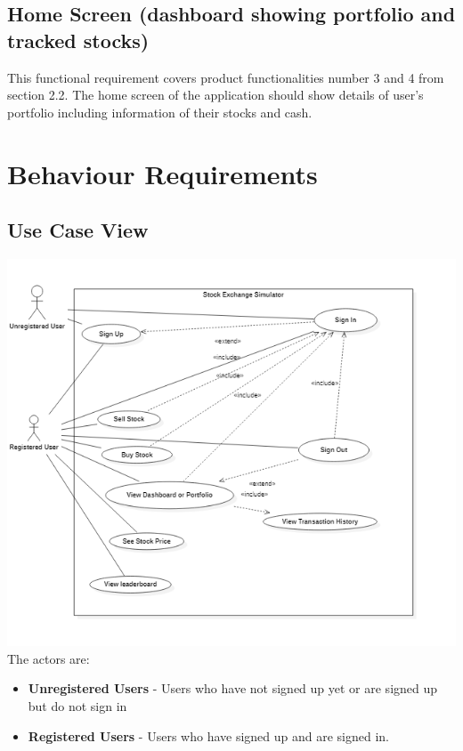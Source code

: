 \documentclass[12 pt, a4paper]{report}
\begin{document}
	
	\subsection{Home Screen (dashboard showing portfolio and tracked stocks)}
	This functional requirement covers product functionalities number 3 and 4 from section 2.2. The home screen of the application should show details of user's portfolio including information of their stocks and cash.

	\section {Behaviour Requirements}

	\subsection {Use Case View}

\includegraphics{usecase}
The actors are:
\begin{itemize}
\item \textbf{Unregistered Users} - Users who have not signed up yet or are signed up but do not sign in
\item \textbf{Registered Users} - Users who have signed up and are signed in.
\end{itemize}
\end{document}

